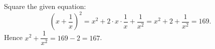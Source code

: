 Square the given equation:
\[
\left(x+\dfrac{1}{x}\right)^2=x^2+2\cdot x\cdot\dfrac{1}{x}+\dfrac{1}{x^2}=x^2+2+\dfrac{1}{x^2}=169 .
\]
Hence $x^2+\dfrac{1}{x^2}=169-2=\boxed{167}$.
